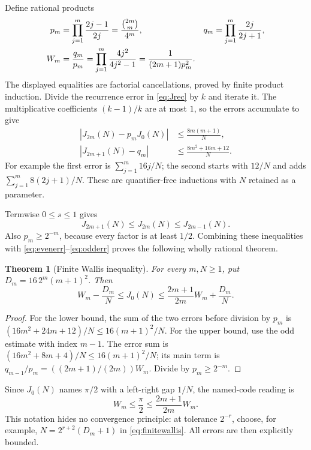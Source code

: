 \documentclass[11pt]{article}
\newtheorem{theorem}{Theorem}[section]
\theoremstyle{definition}
\newcommand{\abs}[1]{\left|#1\right|}
\begin{document}
Define rational products
\begin{align}
 p_m&=\prod_{j=1}^m\frac{2j-1}{2j}
     =\frac{\binom{2m}{m}}{4^m},&
 q_m&=\prod_{j=1}^m\frac{2j}{2j+1},\notag\\
 W_m&=\frac{q_m}{p_m}
     =\prod_{j=1}^m\frac{4j^2}{4j^2-1}
     =\frac1{(2m+1)p_m^2}.\label{eq:W}
\end{align}
The displayed equalities are factorial cancellations, proved by finite
product induction. Divide the recurrence error in \eqref{eq:Jrec} by
$k$ and iterate it. The multiplicative coefficients $(k-1)/k$ are at
most $1$, so the errors accumulate to give
\begin{align}
 \abs{J_{2m}(N)-p_mJ_0(N)}&\le\frac{8m(m+1)}N,\label{eq:evenerr}\\
 \abs{J_{2m+1}(N)-q_m}&\le\frac{8m^2+16m+12}N.\label{eq:odderr}
\end{align}
For example the first error is $\sum_{j=1}^m16j/N$; the second
starts with $12/N$ and adds $\sum_{j=1}^m8(2j+1)/N$.
These are quantifier-free inductions with $N$ retained as a parameter.

Termwise $0\le s\le1$ gives
\[
 J_{2m+1}(N)\le J_{2m}(N)\le J_{2m-1}(N).
\]
Also $p_m\ge2^{-m}$, because every factor is at least $1/2$.
Combining these inequalities with \eqref{eq:evenerr}--\eqref{eq:odderr}
proves the following wholly rational theorem.

\begin{theorem}[Finite Wallis inequality]\label{thm:finitewallis}
For every $m,N\ge1$, put $D_m=16\,2^m(m+1)^2$. Then
\begin{equation}\label{eq:finitewallis}
 \boxed{\quad W_m-\frac{D_m}N\le J_0(N)
 \le\frac{2m+1}{2m}W_m+\frac{D_m}N.\quad}
\end{equation}
\end{theorem}

\begin{proof}
For the lower bound, the sum of the two errors before division by $p_m$
is $(16m^2+24m+12)/N\le16(m+1)^2/N$. For the upper bound, use
the odd estimate with index $m-1$. The error sum is
$(16m^2+8m+4)/N\le16(m+1)^2/N$; its main term is
$q_{m-1}/p_m=((2m+1)/(2m))W_m$. Divide by $p_m\ge2^{-m}$.
\end{proof}

Since $J_0(N)$ names $\pi/2$ with a left-right gap $1/N$,
the named-code reading is
\begin{equation}\label{eq:wallis}
 W_m\le\frac\pi2\le\frac{2m+1}{2m}W_m.
\end{equation}
This notation hides no convergence principle: at tolerance $2^{-r}$,
choose, for example, $N=2^{r+2}(D_m+1)$ in
\eqref{eq:finitewallis}. All errors are then explicitly bounded.
\end{document}
